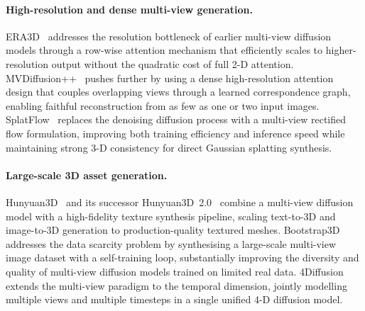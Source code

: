 \paragraph{High-resolution and dense multi-view generation.}
ERA3D~\citep{li2024era3d} addresses the resolution bottleneck of earlier
multi-view diffusion models through a row-wise attention mechanism that
efficiently scales to higher-resolution output without the quadratic cost
of full 2-D attention.
MVDiffusion++~\citep{tang2024mvdiffusionpp} pushes further by using a dense
high-resolution attention design that couples overlapping views through
a learned correspondence graph, enabling faithful reconstruction from as
few as one or two input images.
SplatFlow~\citep{go2024splatflow} replaces the denoising diffusion process
with a multi-view rectified flow formulation, improving both training
efficiency and inference speed while maintaining strong 3-D consistency
for direct Gaussian splatting synthesis.

\paragraph{Large-scale 3D asset generation.}
Hunyuan3D~\citep{yang2024hunyuan3d} and its successor
Hunyuan3D~2.0~\citep{zhao2025hunyuan3dv2} combine a multi-view diffusion model
with a high-fidelity texture synthesis pipeline, scaling text-to-3D and
image-to-3D generation to production-quality textured meshes.
Bootstrap3D~\citep{sun2024bootstrap3d} addresses the data scarcity problem by
synthesising a large-scale multi-view image dataset with a self-training
loop, substantially improving the diversity and quality of multi-view
diffusion models trained on limited real data.
4Diffusion~\citep{zhang2024_4diffusion} extends the multi-view paradigm to
the temporal dimension, jointly modelling multiple views and multiple
timesteps in a single unified 4-D diffusion model.

